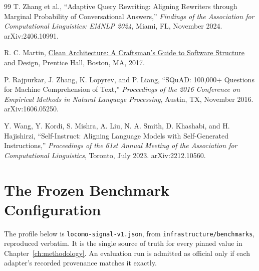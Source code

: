 \documentclass[12pt,letterpaper,oneside]{report}
\newcommand{\code}[1]{\texttt{\small #1}}
\newcommand{\booktitle}[1]{\uline{#1}}
\begin{document}
\begin{thebibliography}{99}
 T. Zhang et al., ``Adaptive Query Rewriting:
Aligning Rewriters through Marginal Probability of Conversational Answers,''
\emph{Findings of the Association for Computational Linguistics: EMNLP 2024},
Miami, FL, November 2024. arXiv:2406.10991.

 R. C. Martin, \booktitle{Clean Architecture: A Craftsman's Guide to Software
Structure and Design}, Prentice
Hall, Boston, MA, 2017.

 P. Rajpurkar, J. Zhang, K. Lopyrev, and
P. Liang, ``SQuAD: 100,000+ Questions for Machine Comprehension of Text,''
\emph{Proceedings of the 2016 Conference on Empirical Methods in Natural
Language Processing}, Austin, TX, November 2016. arXiv:1606.05250.

 Y. Wang, Y. Kordi, S. Mishra, A. Liu,
N. A. Smith, D. Khashabi, and H. Hajishirzi, ``Self-Instruct: Aligning Language
Models with Self-Generated Instructions,'' \emph{Proceedings of the 61st Annual
Meeting of the Association for Computational Linguistics}, Toronto, July 2023.
arXiv:2212.10560.

\end{thebibliography}
\endgroup

\appendix
\renewcommand{\thechapter}{\Alph{chapter}}
\titleformat{\chapter}[hang]
  {\normalfont\bfseries\large\filcenter}{Appendix \thechapter.}{1em}{}
\renewcommand{\cftchappresnum}{Appendix }
\addtolength{\cftchapnumwidth}{4.2em}

\chapter{The Frozen Benchmark Configuration}
\label{app:config}

The profile below is \code{locomo-signal-v1.json}, from
\code{infrastructure/benchmarks}, reproduced verbatim. It is the single source of truth for every pinned value in
Chapter~\ref{ch:methodology}. An evaluation run is admitted as official only if
each adapter's recorded provenance matches it exactly.
\end{document}
